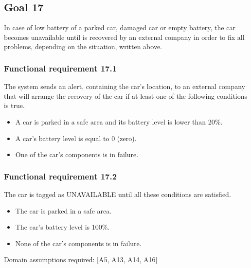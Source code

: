 \subsection{Goal 17}
In case of low battery of a parked car, damaged car or empty battery, the car becomes unavailable until is recovered by an external company in order to fix all problems, depending on the situation, written above. 

\setcounter{secnumdepth}{3}
\subsubsection{Functional requirement 17.1}
The system sends an alert, containing the car's location, to an external company that will arrange the recovery of the car if at least one of the following conditions is true.

\begin{itemize}
	\item A car is parked in a safe area and its battery level is lower than 20\%.
	\item A car's battery level is equal to 0 (zero).
	\item One of the car's components is in failure.
\end{itemize}

\subsubsection{Functional requirement 17.2}
The car is tagged as UNAVAILABLE until all these conditions are satisfied.

\begin{itemize}
	\item The car is parked in a safe area.
	\item The car's battery level is 100\%.
	\item None of the car's components is in failure.
\end{itemize}

\noindent Domain assumptions required: [A5, A13, A14, A16]
